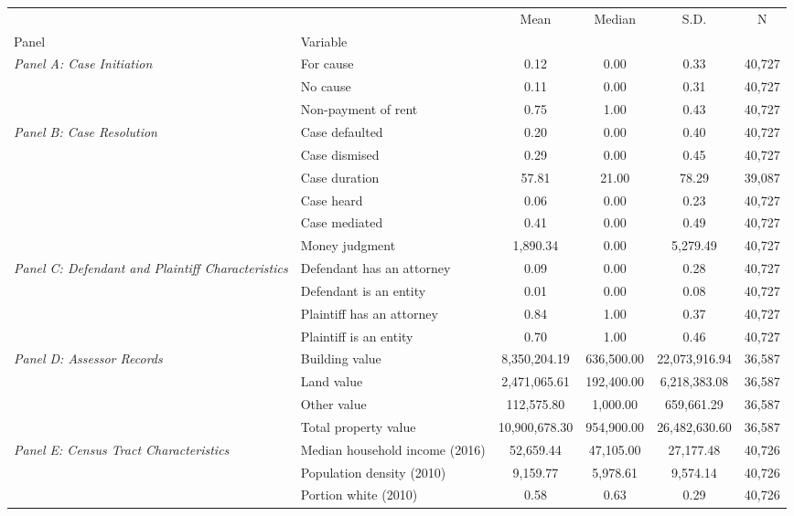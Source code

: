 \begin{tabular}{llcccc}
\toprule
 &  & Mean & Median & S.D. & N \\
Panel & Variable &  &  &  &  \\
\midrule
\multirow[c]{3}{3cm}{\textit{Panel A: Case Initiation}} & For cause & 0.12 & 0.00 & 0.33 & 40,727 \\
 & No cause & 0.11 & 0.00 & 0.31 & 40,727 \\
 & Non-payment of rent & 0.75 & 1.00 & 0.43 & 40,727 \\
\cline{1-6}
\multirow[c]{6}{3cm}{\textit{Panel B: Case Resolution}} & Case defaulted & 0.20 & 0.00 & 0.40 & 40,727 \\
 & Case dismised & 0.29 & 0.00 & 0.45 & 40,727 \\
 & Case duration & 57.81 & 21.00 & 78.29 & 39,087 \\
 & Case heard & 0.06 & 0.00 & 0.23 & 40,727 \\
 & Case mediated & 0.41 & 0.00 & 0.49 & 40,727 \\
 & Money judgment & 1,890.34 & 0.00 & 5,279.49 & 40,727 \\
\cline{1-6}
\multirow[c]{4}{3cm}{\textit{Panel C: Defendant and Plaintiff Characteristics}} & Defendant has an attorney & 0.09 & 0.00 & 0.28 & 40,727 \\
 & Defendant is an entity & 0.01 & 0.00 & 0.08 & 40,727 \\
 & Plaintiff has an attorney & 0.84 & 1.00 & 0.37 & 40,727 \\
 & Plaintiff is an entity & 0.70 & 1.00 & 0.46 & 40,727 \\
\cline{1-6}
\multirow[c]{4}{3cm}{\textit{Panel D: Assessor Records}} & Building value & 8,350,204.19 & 636,500.00 & 22,073,916.94 & 36,587 \\
 & Land value & 2,471,065.61 & 192,400.00 & 6,218,383.08 & 36,587 \\
 & Other value & 112,575.80 & 1,000.00 & 659,661.29 & 36,587 \\
 & Total property value & 10,900,678.30 & 954,900.00 & 26,482,630.60 & 36,587 \\
\cline{1-6}
\multirow[c]{3}{3cm}{\textit{Panel E: Census Tract Characteristics}} & Median household income (2016) & 52,659.44 & 47,105.00 & 27,177.48 & 40,726 \\
 & Population density (2010) & 9,159.77 & 5,978.61 & 9,574.14 & 40,726 \\
 & Portion white (2010) & 0.58 & 0.63 & 0.29 & 40,726 \\
\cline{1-6}

\end{tabular}
